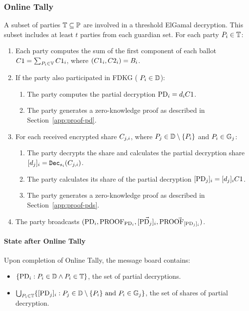 \documentclass[lettersize,journal]{IEEEtran}
\theoremstyle{definition}
\begin{document}
\subsubsection{Online Tally}
A subset of parties $\mathbb{T} \subseteq \mathbb{P}$ are involved in a threshold ElGamal decryption. This subset includes at least $t$ parties from each guardian set.
For each party $P_{i} \in \mathbb{T}$:

\begin{enumerate}
    \item Each party computes the sum of the first component of each ballot $C1 = \sum_{P_{i} \in \mathbb{V}} C1_{i}$, where $(C1_{i},C2_{i})=B_{i}$.
    \item If the party also participated in FDKG ( $P_{i} \in \mathbb{D}$):
    \begin{enumerate}
    	\item The party computes the partial decryption $\mathrm{PD}_{i} = d_{i} C1$.
    	\item The party generates a zero-knowledge proof  as described in Section~\ref{app:proof-pd}.
    \end{enumerate}
    
    \item For each received encrypted share $C_{j,i}$, where $P_{j} \in \mathbb{D} \setminus \{P_{i}\}$ and $P_{i} \in \mathbb{G}_{j}$:
        \begin{enumerate}
            \item The party decrypts the share and calculates the partial decryption share $[d_{j}]_{i}=\texttt{Dec}_{s_{i}}(C_{j,i})$.
            \item The party calculates its share of the partial decryption $[\mathrm{PD}_{j}]_{i} = [d_{j}]_{i} C1$.
            \item The party generates a zero-knowledge proof  as described in Section~\ref{app:proof-pds}.
        \end{enumerate}
        \item  The party broadcasts $(\mathrm{PD}_{i},\textrm{PROOF}_{\mathrm{PD}_{i}}, \vec{[\mathrm{PD}_{j}]_{i}},\vec{\textrm{PROOF}_{[\mathrm{PD}_{j}]_{i}}})$.
\end{enumerate}
\paragraph*{State after Online Tally}
Upon completion of Online Tally, the message board contains:
\begin{itemize}
    \item $\{\mathrm{PD}_{i} :  P_{i} \in \mathbb{D} \land P_{i} \in \mathbb{T}\}$, the set of partial decryptions.
    \item $\bigcup_{P_{i} \in \mathbb{T}} \{[\mathrm{PD}_{j}]_{i} : P_{j} \in \mathbb{D} \setminus \{P_{i}\} \text{ and } P_{i} \in \mathbb{G}_{j}\}$, the set of shares of partial decryption.
\end{itemize}
\end{document}
